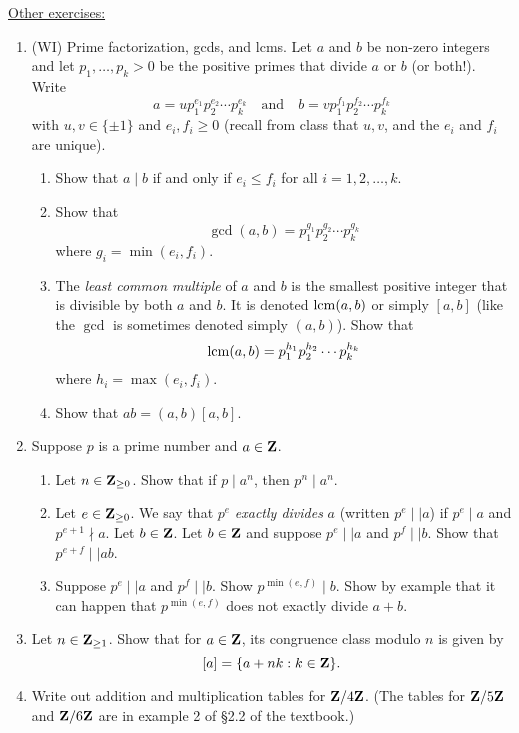 \documentclass[12pt]{article}
\begin{document}
\vspace{12pt}
\underline{Other exercises:}
\vspace{-4pt}
\begin{enumerate}
	\item (WI) Prime factorization, gcds, and lcms. Let $a$ and $b$ be non-zero integers and let $p_1,\dots,p_k>0$ be the positive primes that divide $a$ or $b$ (or both!). Write
	\[
		a=up_1^{e_1}p_2^{e_2}\cdots p_k^{e_k}\quad\text{and}\quad b=vp_1^{f_1}p_2^{f_2}\cdots p_k^{f_k}
	\]
	with $u,v\in\{\pm1\}$ and $e_i,f_i\geq0$ (recall from class that $u,v$, and the $e_i$ and $f_i$ are unique).
	\begin{enumerate}
		\item Show that $a\mid b$ if and only if $e_i\leq f_i$ for all $i=1,2,\dots,k$.
		\item Show that
		\[
			\gcd(a,b)=p_1^{g_1}p_2^{g_2}\cdots p_k^{g_k}
		\]
		where $g_i=\min(e_i,f_i)$.
		\item The \textit{least common multiple} of $a$ and $b$ is the smallest positive integer that is divisible by both $a$ and $b$. It is denoted $\operatorname{lcm}(a,b)$ or simply $[a,b]$ (like the $\gcd$ is sometimes denoted simply $(a,b)$). Show that
		\[
			\operatorname{lcm}(a,b)=p_1^{h_1}p_2^{h_2}\cdots p_k^{h_k}
		\]
		where $h_i=\max(e_i,f_i)$.
		
		\item Show that $ab=(a,b)[a,b]$.
	\end{enumerate}
	
	\item Suppose $p$ is a prime number and $a\in\mathbf{Z}$.
	\begin{enumerate}
		\item Let $n\in\mathbf{Z}_{\geq0}$. Show that if $p\mid a^n$, then $p^n\mid a^n$.
		\item Let $e\in\mathbf{Z}_{\geq0}$. We say that $p^e$ \textit{exactly divides} $a$ (written $p^e\mid\mid a$) if $p^e\mid a$ and $p^{e+1}\nmid a$. Let $b\in\mathbf{Z}$. Let $b\in\mathbf{Z}$ and suppose $p^e\mid\mid a$ and $p^f\mid\mid b$. Show that $p^{e+f}\mid\mid ab$.
		\item Suppose $p^e\mid\mid a$ and $p^f\mid\mid b$. Show $p^{\min(e,f)}\mid b$. Show by example that it can happen that $p^{\min(e,f)}$ does not exactly divide $a+b$.
	\end{enumerate}
	
	\item Let $n\in\mathbf{Z}_{\geq1}$. Show that for $a\in\mathbf{Z}$, its congruence class modulo $n$ is given by
	\[
		[a]=\{a+nk:k\in\mathbf{Z}\}.
	\]
	
	\item Write out addition and multiplication tables for $\mathbf{Z}/4\mathbf{Z}$. (The tables for $\mathbf{Z}/5\mathbf{Z}$ and $\mathbf{Z}/6\mathbf{Z}$ are in example 2 of \S2.2 of the textbook.)
\end{enumerate}
\end{document}
